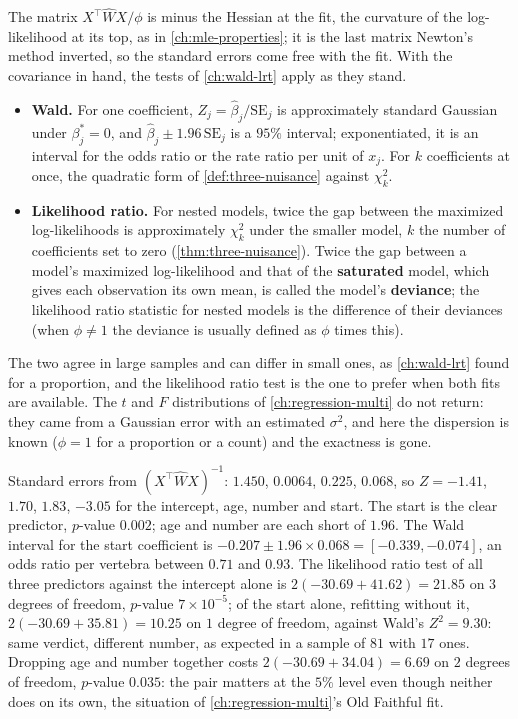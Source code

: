 The matrix $X^\top\hat{W}X/\phi$ is minus the Hessian at the fit, the curvature of the log-likelihood at its top, as in \cref{ch:mle-properties}; it is the last matrix Newton's method inverted, so the standard errors come free with the fit.
With the covariance in hand, the tests of \cref{ch:wald-lrt} apply as they stand.
\begin{itemize}[nosep]
\item \textbf{Wald.} For one coefficient, $Z_j = \hat{\beta}_j/\mathrm{SE}_j$ is approximately standard Gaussian under $\beta_j^* = 0$, and $\hat{\beta}_j \pm 1.96\,\mathrm{SE}_j$ is a $95\%$ interval; exponentiated, it is an interval for the odds ratio or the rate ratio per unit of $x_j$. For $k$ coefficients at once, the quadratic form of \cref{def:three-nuisance} against $\chi^2_k$.
\item \textbf{Likelihood ratio.} For nested models, twice the gap between the maximized log-likelihoods is approximately $\chi^2_k$ under the smaller model, $k$ the number of coefficients set to zero (\cref{thm:three-nuisance}). Twice the gap between a model's maximized log-likelihood and that of the \textbf{saturated} model, which gives each observation its own mean, is called the model's \textbf{deviance}; the likelihood ratio statistic for nested models is the difference of their deviances (when $\phi \neq 1$ the deviance is usually defined as $\phi$ times this).
\end{itemize}
The two agree in large samples and can differ in small ones, as \cref{ch:wald-lrt} found for a proportion, and the likelihood ratio test is the one to prefer when both fits are available.
The $t$ and $F$ distributions of \cref{ch:regression-multi} do not return: they came from a Gaussian error with an estimated $\sigma^2$, and here the dispersion is known ($\phi = 1$ for a proportion or a count) and the exactness is gone.

\begin{worked}
Standard errors from $(X^\top\hat{W}X)^{-1}$: $1.450$, $0.0064$, $0.225$, $0.068$, so $Z = -1.41$, $1.70$, $1.83$, $-3.05$ for the intercept, age, number and start. The start is the clear predictor, $p$-value $0.002$; age and number are each short of $1.96$. The Wald interval for the start coefficient is $-0.207 \pm 1.96 \times 0.068 = [-0.339, -0.074]$, an odds ratio per vertebra between $0.71$ and $0.93$. The likelihood ratio test of all three predictors against the intercept alone is $2(-30.69 + 41.62) = 21.85$ on $3$ degrees of freedom, $p$-value $7 \times 10^{-5}$; of the start alone, refitting without it, $2(-30.69 + 35.81) = 10.25$ on $1$ degree of freedom, against Wald's $Z^2 = 9.30$: same verdict, different number, as expected in a sample of $81$ with $17$ ones. Dropping age and number together costs $2(-30.69 + 34.04) = 6.69$ on $2$ degrees of freedom, $p$-value $0.035$: the pair matters at the $5\%$ level even though neither does on its own, the situation of \cref{ch:regression-multi}'s Old Faithful fit.
\end{worked}

